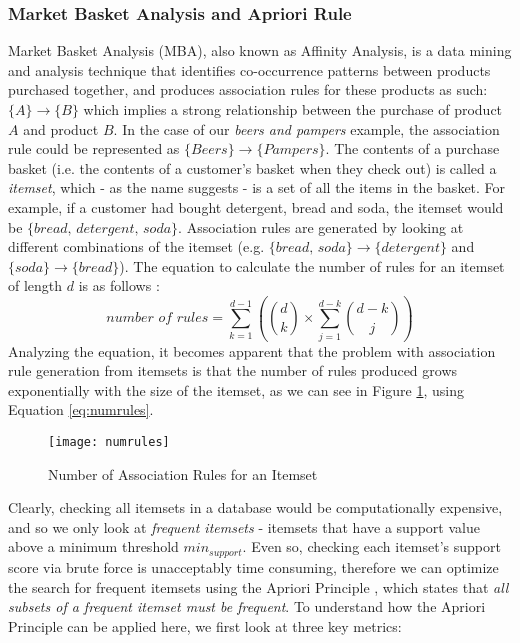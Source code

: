 \documentclass[a4paper,11pt]{article}
\newcommand{\setA}{\{A\}}
\newcommand{\setB}{\{B\}}
\newcommand{\abrule}{\setA\rightarrow\setB}
\begin{document}
\subsubsection{Market Basket Analysis and Apriori Rule}
\label{mba_define}
Market Basket Analysis (MBA), also known as Affinity Analysis, is a data mining and analysis technique that identifies co-occurrence patterns between products purchased together, and produces association rules for these products as such: $\abrule$ which implies a strong relationship between the purchase of product $A$ and product $B$. In the case of our \textit{beers and pampers} example, the association rule could be represented as $\{Beers\} \rightarrow \{Pampers\}$. The contents of a purchase basket (i.e. the contents of a customer's basket when they check out) is called a \textit{itemset}, which - as the name suggests - is a set of all the items in the basket.  For example, if a customer had bought detergent, bread and soda, the itemset would be $\{\textit{bread, detergent, soda}\}$. Association rules are generated by looking at different combinations of the itemset (e.g. $\{\textit{bread, soda}\}\rightarrow\{\textit{detergent}\}$ and $\{\textit{soda}\}\rightarrow\{\textit{bread}\}$). 
The equation \cite{num_rules} to calculate the number of rules for an itemset of length $d$ is as follows :\\
\begin{equation}
\textit{number of rules} = \sum\limits_{k=1}^{d-1} \left(\binom{d}{k} \times \sum\limits_{j=1}^{d-k}\binom{d-k}{j}  \right)
\label{eq:numrules}
\end{equation}
Analyzing the equation, it becomes apparent that the problem with association rule generation from itemsets is that the number of rules produced grows exponentially with the size of the itemset, as we can see in Figure \ref{fig:numrules}, using Equation \ref{eq:numrules}.  
\begin{figure}[H]
\centering
\texttt{[image: numrules]}
\caption{Number of Association Rules for an Itemset}
\label{fig:numrules}
\end{figure}
Clearly, checking all itemsets in a database would be computationally expensive, and so we only look at \textit{frequent itemsets} - itemsets that have a support value above a minimum threshold $\textit{min}_{\textit{support}}$. Even so, checking each itemset's support score via brute force is unacceptably time consuming, therefore we can optimize the search for frequent itemsets using the Apriori Principle \cite{mine}, which states that \textit{all subsets of a frequent itemset must be frequent}. To understand how the Apriori Principle can be applied here, we first look at three key metrics:
\end{document}
